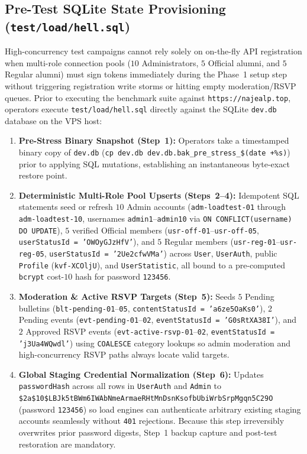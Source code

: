 \documentclass[11pt,letterpaper]{article}
\begin{document}
\subsection{Pre-Test SQLite State Provisioning (\texttt{test/load/hell.sql})}
High-concurrency test campaigns cannot rely solely on on-the-fly API registration when multi-role connection pools ($10$ Administrators, $5$ Official alumni, and $5$ Regular alumni) must sign tokens immediately during the Phase~1 setup step without triggering registration write storms or hitting empty moderation/RSVP queues. Prior to executing the benchmark suite against \texttt{https://najealp.top}, operators execute \texttt{test/load/hell.sql} directly against the SQLite \texttt{dev.db} database on the VPS host:
\begin{enumerate}
  \item \textbf{Pre-Stress Binary Snapshot (Step~1):} Operators take a timestamped binary copy of \texttt{dev.db} (\texttt{cp dev.db dev.db.bak\_pre\_stress\_\$(date +\%s)}) prior to applying SQL mutations, establishing an instantaneous byte-exact restore point.
  \item \textbf{Deterministic Multi-Role Pool Upserts (Steps~2--4):} Idempotent SQL statements seed or refresh $10$ Admin accounts (\texttt{adm-loadtest-01} through \texttt{adm-loadtest-10}, usernames \texttt{admin1}--\texttt{admin10} via \texttt{ON CONFLICT(username) DO UPDATE}), $5$ verified Official members (\texttt{usr-off-01}--\texttt{usr-off-05}, \texttt{userStatusId = 'OWOyGJzHfV'}), and $5$ Regular members (\texttt{usr-reg-01}--\texttt{usr-reg-05}, \texttt{userStatusId = '2Ue2cfwVMa'}) across \texttt{User}, \texttt{UserAuth}, public \texttt{Profile} (\texttt{kvf-XCOljU}), and \texttt{UserStatistic}, all bound to a pre-computed \texttt{bcrypt} cost-$10$ hash for password \texttt{123456}.
  \item \textbf{Moderation \& Active RSVP Targets (Step~5):} Seeds $5$ Pending bulletins (\texttt{blt-pending-01}--\texttt{05}, \texttt{contentStatusId = 'a6ze5OaKs0'}), $2$ Pending events (\texttt{evt-pending-01}--\texttt{02}, \texttt{eventStatusId = 'G0sRtXA38I'}), and $2$ Approved RSVP events (\texttt{evt-active-rsvp-01}--\texttt{02}, \texttt{eventStatusId = 'j3Ua4WQwdl'}) using \texttt{COALESCE} category lookups so admin moderation and high-concurrency RSVP paths always locate valid targets.
  \item \textbf{Global Staging Credential Normalization (Step~6):} Updates \texttt{passwordHash} across all rows in \texttt{UserAuth} and \texttt{Admin} to \texttt{\$2a\$10\$LBJk5tBWm6IWAbNmeArmaeRHtMnDsnKsofbUbiWrbSrpMgqn5C29O} (password \texttt{123456}) so load engines can authenticate arbitrary existing staging accounts seamlessly without \texttt{401} rejections. Because this step irreversibly overwrites prior password digests, Step~1 backup capture and post-test restoration are mandatory.
\end{enumerate}
\end{document}
